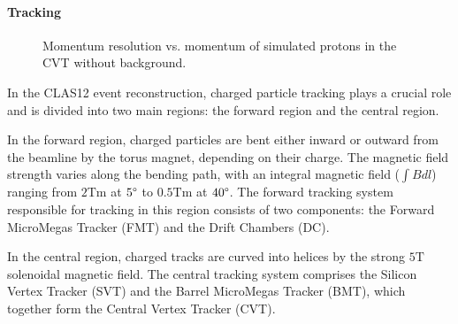 \paragraph{Tracking}
    \begin{figure}
        \centering{}
        \caption[CVT momentum resolution vs. momentum.]{Momentum resolution vs. momentum of simulated protons in the CVT without background.}
        \label{fig::cvt_pres}
    \end{figure}

    In the CLAS12 event reconstruction, charged particle tracking plays a crucial role and is divided into two main regions: the forward region and the central region.

    In the forward region, charged particles are bent either inward or outward from the beamline by the torus magnet, depending on their charge.
    The magnetic field strength varies along the bending path, with an integral magnetic field ($\int Bdl$) ranging from $2 \text{Tm}$ at $5\degree$ to $0.5 \text{Tm}$ at $40\degree$.
    The forward tracking system responsible for tracking in this region consists of two components: the Forward MicroMegas Tracker (FMT) and the Drift Chambers (DC).

    In the central region, charged tracks are curved into helices by the strong $5 \text{T}$ solenoidal magnetic field.
    The central tracking system comprises the Silicon Vertex Tracker (SVT) and the Barrel MicroMegas Tracker (BMT), which together form the Central Vertex Tracker (CVT).

